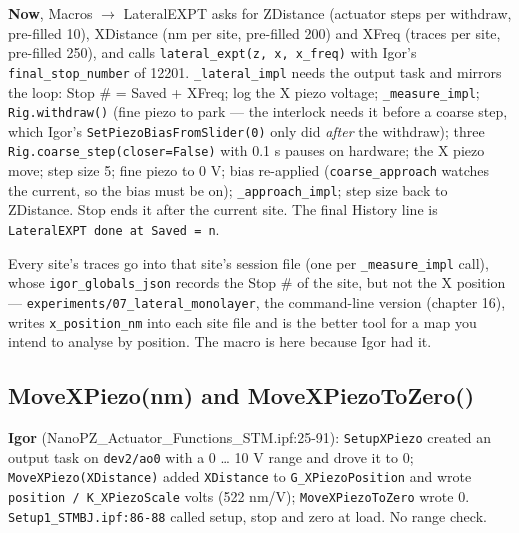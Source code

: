 \textbf{Now}, Macros $\rightarrow$ LateralEXPT asks for ZDistance (actuator steps per withdraw, pre-filled 10), XDistance (nm per site, pre-filled 200) and XFreq (traces per site, pre-filled 250), and calls \texttt{lateral\_\discretionary{}{}{}expt(z,\discretionary{}{}{} x,\discretionary{}{}{} x\_\discretionary{}{}{}freq)} with Igor's \texttt{final\_\discretionary{}{}{}stop\_\discretionary{}{}{}number} of 12201. \texttt{\_\discretionary{}{}{}lateral\_\discretionary{}{}{}impl} needs the output task and mirrors the loop: Stop \# = Saved + XFreq; log the X piezo voltage; \texttt{\_\discretionary{}{}{}measure\_\discretionary{}{}{}impl}; \texttt{Rig.\discretionary{}{}{}withdraw()} (fine piezo to park --- the interlock needs it before a coarse step, which Igor's \texttt{Set\discretionary{}{}{}Piezo\discretionary{}{}{}Bias\discretionary{}{}{}From\discretionary{}{}{}Slider(0)} only did \emph{after} the withdraw); three \texttt{Rig.\discretionary{}{}{}coarse\_\discretionary{}{}{}step(closer=False)} with 0.1 s pauses on hardware; the X piezo move; step size 5; fine piezo to 0 V; bias re-applied (\texttt{coarse\_\discretionary{}{}{}approach} watches the current, so the bias must be on); \texttt{\_\discretionary{}{}{}approach\_\discretionary{}{}{}impl}; step size back to ZDistance. Stop ends it after the current site. The final History line is \texttt{Lateral\discretionary{}{}{}EXPT done at Saved = n}.

Every site's traces go into that site's session file (one per \texttt{\_\discretionary{}{}{}measure\_\discretionary{}{}{}impl} call), whose \texttt{igor\_\discretionary{}{}{}globals\_\discretionary{}{}{}json} records the Stop \# of the site, but not the X position --- \texttt{experiments/\discretionary{}{}{}07\_\discretionary{}{}{}lateral\_\discretionary{}{}{}monolayer}, the command-line version (chapter 16), writes \texttt{x\_\discretionary{}{}{}position\_\discretionary{}{}{}nm} into each site file and is the better tool for a map you intend to analyse by position. The macro is here because Igor had it.

\subsection{MoveXPiezo(nm) and MoveXPiezoToZero()}

\textbf{Igor} (NanoPZ\_Actuator\_Functions\_STM.ipf:25-91): \texttt{Setup\discretionary{}{}{}XPiezo} created an output task on \texttt{dev2/\discretionary{}{}{}ao0} with a 0 \ldots{} 10 V range and drove it to 0; \texttt{Move\discretionary{}{}{}XPiezo(XDistance)} added \texttt{XDistance} to \texttt{G\_\discretionary{}{}{}XPiezo\discretionary{}{}{}Position} and wrote \texttt{position /\discretionary{}{}{} K\_\discretionary{}{}{}XPiezo\discretionary{}{}{}Scale} volts (522 nm/V); \texttt{Move\discretionary{}{}{}XPiezo\discretionary{}{}{}To\discretionary{}{}{}Zero} wrote 0. \texttt{Setup1\_\discretionary{}{}{}STMBJ.\discretionary{}{}{}ipf:86-88} called setup, stop and zero at load. No range check.

